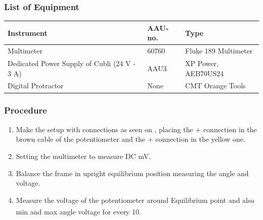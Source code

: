 \subsubsection{List of Equipment}
\begin{table}[H]
	\begin{tabular}{|l|l|p{4.3cm}|}
		\hline%
		\textbf{Instrument}                                  &  \textbf{AAU-no.}  &  \textbf{Type}                       \\
		\hline%
		Multimeter                                           &  60760           &  Fluke 189 Multimeter		                   \\
		\hline%
		Dedicated Power Supply of Cubli \small{(24 V - 3 A)} &  AAU3                   &  XP Power, AEB70US24                 \\
		\hline%
		Digital Protractor                                   &  None               & CMT Orange Tools     \\
		\hline%
	\end{tabular}
\end{table}

\subsubsection{Procedure}
\begin{enumerate}
	\item Make the setup with connections as seen on , placing the + connection in the brown cable of the potentiometer and the + connection in the yellow one.
	\item Setting the multimeter to measure DC mV.
	\item Balance the frame in upright equilibrium position measuring the angle and voltage.
	\item Measure the voltage of the potentiometer around Equilibrium point and also min and max angle voltage for every \si{10^{\circ}}.
\end{enumerate}


